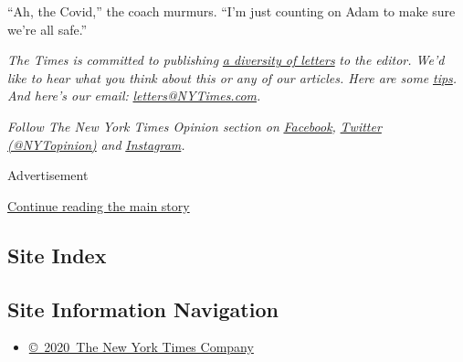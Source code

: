 ``Ah, the Covid,'' the coach murmurs. ``I'm just counting on Adam to
make sure we're all safe.''

\emph{The Times is committed to publishing}
\href{https://www.nytimes3xbfgragh.onion/2019/01/31/opinion/letters/letters-to-editor-new-york-times-women.html}{\emph{a
diversity of letters}} \emph{to the editor. We'd like to hear what you
think about this or any of our articles. Here are some}
\href{https://help.nytimes3xbfgragh.onion/hc/en-us/articles/115014925288-How-to-submit-a-letter-to-the-editor}{\emph{tips}}\emph{.
And here's our email:}
\href{mailto:letters@NYTimes.com}{\emph{letters@NYTimes.com}}\emph{.}

\emph{Follow The New York Times Opinion section on}
\href{https://www.facebookcorewwwi.onion/nytopinion}{\emph{Facebook}}\emph{,}
\href{http://twitter.com/NYTOpinion}{\emph{Twitter (@NYTopinion)}}
\emph{and}
\href{https://www.instagram.com/nytopinion/}{\emph{Instagram}}\emph{.}

Advertisement

\protect\hyperlink{after-bottom}{Continue reading the main story}

\hypertarget{site-index}{%
\subsection{Site Index}\label{site-index}}

\hypertarget{site-information-navigation}{%
\subsection{Site Information
Navigation}\label{site-information-navigation}}

\begin{itemize}
\tightlist
\item
  \href{https://help.nytimes3xbfgragh.onion/hc/en-us/articles/115014792127-Copyright-notice}{©~2020~The
  New York Times Company}
\end{itemize}

